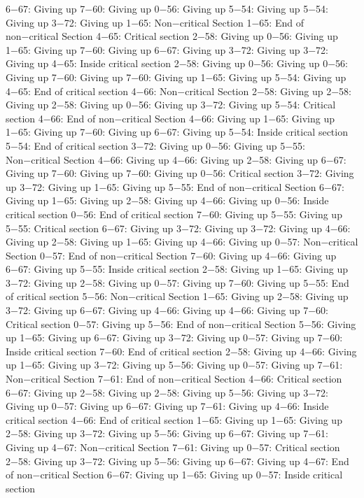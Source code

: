 6−67: Giving up
7−60: Giving up
0−56: Giving up
5−54: Giving up
5−54: Giving up
3−72: Giving up
1−65: Non−critical Section
1−65: End of non−critical Section
4−65: Critical section
2−58: Giving up
0−56: Giving up
1−65: Giving up
7−60: Giving up
6−67: Giving up
3−72: Giving up
3−72: Giving up
4−65: Inside critical section
2−58: Giving up
0−56: Giving up
0−56: Giving up
7−60: Giving up
7−60: Giving up
1−65: Giving up
5−54: Giving up
4−65: End of critical section
4−66: Non−critical Section
2−58: Giving up
2−58: Giving up
2−58: Giving up
0−56: Giving up
3−72: Giving up
5−54: Critical section
4−66: End of non−critical Section
4−66: Giving up
1−65: Giving up
1−65: Giving up
7−60: Giving up
6−67: Giving up
5−54: Inside critical section
5−54: End of critical section
3−72: Giving up
0−56: Giving up
5−55: Non−critical Section
4−66: Giving up
4−66: Giving up
2−58: Giving up
6−67: Giving up
7−60: Giving up
7−60: Giving up
0−56: Critical section
3−72: Giving up
3−72: Giving up
1−65: Giving up
5−55: End of non−critical Section
6−67: Giving up
1−65: Giving up
2−58: Giving up
4−66: Giving up
0−56: Inside critical section
0−56: End of critical section
7−60: Giving up
5−55: Giving up
5−55: Critical section
6−67: Giving up
3−72: Giving up
3−72: Giving up
4−66: Giving up
2−58: Giving up
1−65: Giving up
4−66: Giving up
0−57: Non−critical Section
0−57: End of non−critical Section
7−60: Giving up
4−66: Giving up
6−67: Giving up
5−55: Inside critical section
2−58: Giving up
1−65: Giving up
3−72: Giving up
2−58: Giving up
0−57: Giving up
7−60: Giving up
5−55: End of critical section
5−56: Non−critical Section
1−65: Giving up
2−58: Giving up
3−72: Giving up
6−67: Giving up
4−66: Giving up
4−66: Giving up
7−60: Critical section
0−57: Giving up
5−56: End of non−critical Section
5−56: Giving up
1−65: Giving up
6−67: Giving up
3−72: Giving up
0−57: Giving up
7−60: Inside critical section
7−60: End of critical section
2−58: Giving up
4−66: Giving up
1−65: Giving up
3−72: Giving up
5−56: Giving up
0−57: Giving up
7−61: Non−critical Section
7−61: End of non−critical Section
4−66: Critical section
6−67: Giving up
2−58: Giving up
2−58: Giving up
5−56: Giving up
3−72: Giving up
0−57: Giving up
6−67: Giving up
7−61: Giving up
4−66: Inside critical section
4−66: End of critical section
1−65: Giving up
1−65: Giving up
2−58: Giving up
3−72: Giving up
5−56: Giving up
6−67: Giving up
7−61: Giving up
4−67: Non−critical Section
7−61: Giving up
0−57: Critical section
2−58: Giving up
3−72: Giving up
5−56: Giving up
6−67: Giving up
4−67: End of non−critical Section
6−67: Giving up
1−65: Giving up
0−57: Inside critical section
